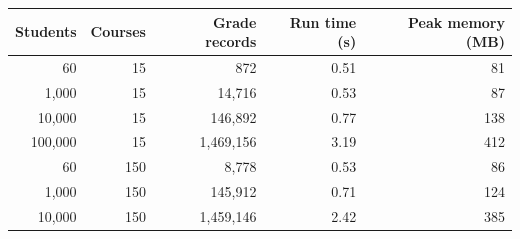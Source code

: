 \begin{tabular}{@{}rrrrr@{}}
\toprule
Students & Courses & Grade records & Run time (s) & Peak memory (MB) \\
\midrule
60 & 15 & 872 & 0.51 & 81 \\
1{,}000 & 15 & 14{,}716 & 0.53 & 87 \\
10{,}000 & 15 & 146{,}892 & 0.77 & 138 \\
100{,}000 & 15 & 1{,}469{,}156 & 3.19 & 412 \\
60 & 150 & 8{,}778 & 0.53 & 86 \\
1{,}000 & 150 & 145{,}912 & 0.71 & 124 \\
10{,}000 & 150 & 1{,}459{,}146 & 2.42 & 385 \\
\bottomrule
\end{tabular}
